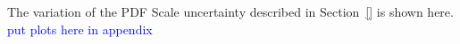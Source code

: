 
The variation of the PDF Scale uncertainty described in Section~\ref{} is shown here.
\textcolor{blue}{put plots here in appendix}



